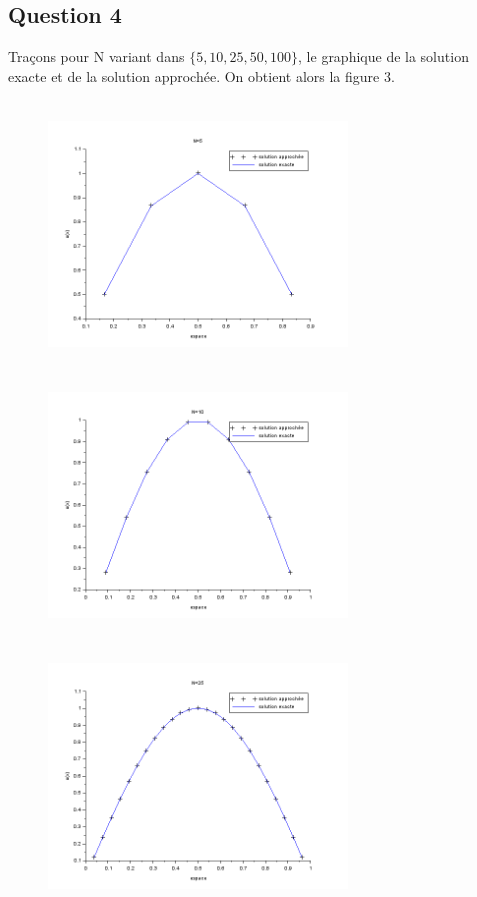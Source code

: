 \documentclass[a4paper,12pt]{article}
\begin{document}
\subsection{Question 4}

Tra\c{c}ons pour N variant dans $\{5, 10, 25, 50, 100\}$, le graphique de la solution exacte et de la solution approch\'ee. On obtient alors la figure 3.

\begin{figure}[h!]
\begin{center}
	\includegraphics[width=225pt,height=200pt]{image/figure_10}
	\includegraphics[width=225pt,height=200pt]{image/figure_9}
	\includegraphics[width=225pt,height=200pt]{image/figure_6}

\end{center}
\end{figure}
\end{document}
